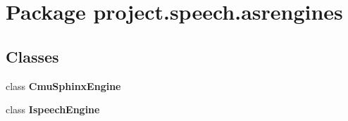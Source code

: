 \section{Package project.\+speech.\+asrengines}
\label{namespaceproject_1_1speech_1_1asrengines}
\subsection*{Classes}
\begin{DoxyCompactItemize}
\item 
class {\bf Cmu\+Sphinx\+Engine}
\item 
class {\bf Ispeech\+Engine}
\end{DoxyCompactItemize}
